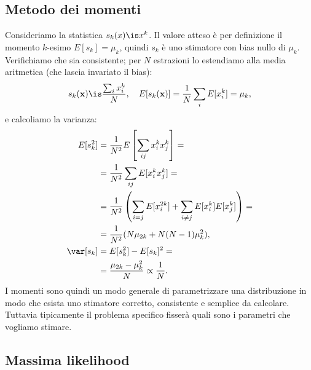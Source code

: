 
\subsection{Metodo dei momenti}

Consideriamo la statistica $s_k(x)\is x^k$.
Il valore atteso è per definizione il momento $k$-esimo
$E[s_k]=\mu_k$,
quindi $s_k$ è uno stimatore con bias nullo di $\mu_k$.
Verifichiamo che sia consistente;
per $N$ estrazioni lo estendiamo alla media aritmetica (che lascia invariato il bias):
\begin{align*}
	s_k(\mathbf x)
	\is \frac{\sum_i x_i^k}N, \quad
	E[s_k(\mathbf x)]
	= \frac1N \sum_i E[x_i^k]
	= \mu_k,
\end{align*}
e calcoliamo la varianza:
\begin{align*}
	E[s_k^2]
	&= \frac1{N^2} E \left[ \sum_{ij} x_i^k x_j^k \right] = \\
	&= \frac1{N^2} \sum_{ij} E[x_i^k x_j^k] = \\
	&= \frac1{N^2} \left( \sum_{i=j} E[x_i^{2k}] + \sum_{i\neq j} E[x_i^k] E[x_j^k] \right) = \\
	&= \frac1{N^2} (N\mu_{2k} + N(N-1)\mu_k^2), \\
	\var[s_k]
	&= E[s_k^2] - E[s_k]^2 = \\
	&= \frac{\mu_{2k} - \mu_k^2}N
	\propto \frac1N.
\end{align*}
I momenti sono quindi un modo generale di parametrizzare una distribuzione in modo che esista uno stimatore corretto, consistente e semplice da calcolare.
Tuttavia tipicamente il problema specifico fisserà quali sono i parametri che vogliamo stimare.

\subsection{Massima likelihood}
\label{sec:ml}

%

